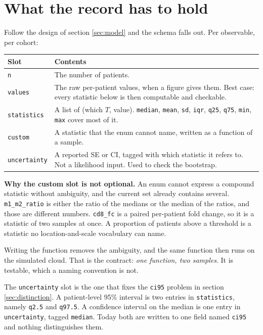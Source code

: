 \documentclass[11pt]{article}
\begin{document}
\section{What the record has to hold}
\label{sec:record}

Follow the design of section \ref{sec:model} and the schema falls out. Per
observable, per cohort:

\begin{center}\small
\begin{tabularx}{\textwidth}{@{}lX@{}}
\toprule
Slot & Contents \\
\midrule
\texttt{n} & The number of patients. \\
\texttt{values} & The raw per-patient values, when a figure gives them. Best case:
                  every statistic below is then computable and checkable. \\
\texttt{statistics} & A list of (which $T$, value). \texttt{median},
                      \texttt{mean}, \texttt{sd}, \texttt{iqr}, \texttt{q25},
                      \texttt{q75}, \texttt{min}, \texttt{max} cover most of it. \\
\texttt{custom} & A statistic that the enum cannot name, written as a function of
                  a sample. \\
\texttt{uncertainty} & A reported SE or CI, tagged with which statistic it refers
                       to. Not a likelihood input. Used to check the bootstrap. \\
\bottomrule
\end{tabularx}
\end{center}

\begin{notebox}
\textbf{Why the custom slot is not optional.} An enum cannot express a compound
statistic without ambiguity, and the current set already contains several.
\texttt{m1\_m2\_ratio} is either the ratio of the medians or the median of the
ratios, and those are different numbers. \texttt{cd8\_fc} is a paired per-patient
fold change, so it is a statistic of two samples at once. A proportion of patients
above a threshold is a statistic no location-and-scale vocabulary can name.

Writing the function removes the ambiguity, and the same function then runs on
the simulated cloud. That is the contract: \emph{one function, two samples}. It
is testable, which a naming convention is not.
\end{notebox}

The \texttt{uncertainty} slot is the one that fixes the \texttt{ci95} problem in
section \ref{sec:distinction}. A patient-level 95\% interval is two entries in
\texttt{statistics}, namely \texttt{q2.5} and \texttt{q97.5}. A confidence
interval on the median is one entry in \texttt{uncertainty}, tagged
\texttt{median}. Today both are written to one field named \texttt{ci95} and
nothing distinguishes them.
\end{document}

